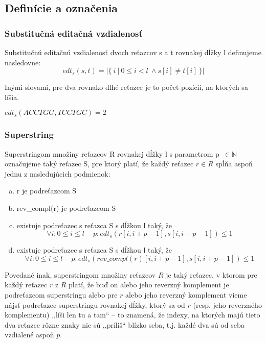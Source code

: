 \subsection{Definície a označenia}

\subsubsection{Substitučná editačná vzdialenosť}
\begin{defn}
Substitučnú editačnú vzdialenosť dvoch reťazcov s a t rovnakej dĺžky l definujeme nasledovne:
$$
edt_s(s, t) = \left\vert{ \{~i~|~0 \leq i < l~\land s[i] \neq t[i] ~\} }\right\vert
$$
\end{defn}

Inými slovami, pre dva rovnako dlhé reťazce je to počet pozícií, na ktorých sa líšia.

\begin{example}
$edt_s(ACCTGG, TCCTGC) = 2$ 
\end{example}

\subsubsection{Superstring}
\begin{defn}
Superstringom množiny reťazcov R rovnakej dĺžky l s parametrom p~$\in \mathbb{N}$ označujeme taký reťazec S, pre ktorý platí, že každý reťazec $r \in R$ spĺňa aspoň jednu z nasledujúcich podmienok:
    \begin{enumerate}[(a)]
    \item r je podreťazcom S
    \item rev\_compl(r) je podreťazcom S
    \item existuje podreťazec s reťazca S s dĺžkou l taký, že 
    $$
    \forall i : 0 \leq i \leq l - p : edt_s(r[i, i+p-1], s[i, i+p-1]) \leq 1
    $$
    \item existuje podreťazec s reťazca S s dĺžkou l taký, že 
    $$
    \forall i : 0 \leq i \leq l - p : edt_s(rev\_compl(r)[i, i+p-1], s[i, i+p-1]) \leq 1
    $$    
    \end{enumerate}
\end{defn}

Povedané inak, superstringom množiny reťazcov $R$ je taký reťazec, v ktorom pre každý reťazec $r$ z $R$ platí, že buď on alebo jeho reverzný komplement je podreťazcom superstringu alebo pre $r$ alebo jeho reverzný komplement vieme nájsť podreťazec superstringu rovnakej dĺžky, ktorý sa od $r$ (resp. jeho reverzného komplementu) ,,líši len tu a tam`` -- to znamená, že indexy, na ktorých majú tieto dva reťazce rôzne znaky nie sú ,,príliš`` blízko seba, t.j. každé dva sú od seba vzdialené aspoň $p$.

